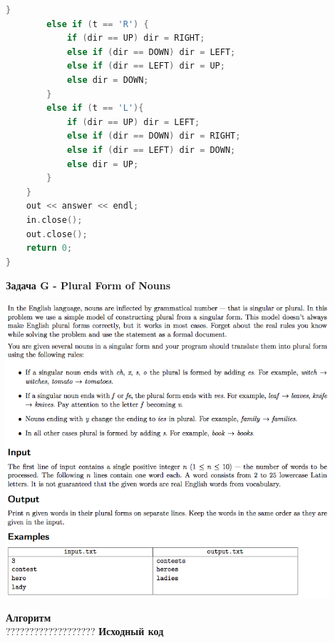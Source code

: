 \documentclass[a4paper,12pt]{article}
\begin{document}
\begin{lstlisting}[language=C]
        }
        else if (t == 'R') {
            if (dir == UP) dir = RIGHT;
            else if (dir == DOWN) dir = LEFT;
            else if (dir == LEFT) dir = UP;
            else dir = DOWN;
        }
        else if (t == 'L'){
            if (dir == UP) dir = LEFT;
            else if (dir == DOWN) dir = RIGHT;
            else if (dir == LEFT) dir = DOWN;
            else dir = UP;
        }
    }
    out << answer << endl;
    in.close();
    out.close();
    return 0;
}
\end{lstlisting}


\newpage
\textbf{{\large Задача G - Plural Form of Nouns}} \\
\begin{center}
\includegraphics[width=0.9\textwidth]{CT_S02E05/CT_S02E05_G.png}\\ [1cm]
\end{center}
\textbf{{\large Алгоритм}} \\
{\Huge ???????????????????}
\newpage
\textbf{{\large Исходный код}} \\
\end{document}
